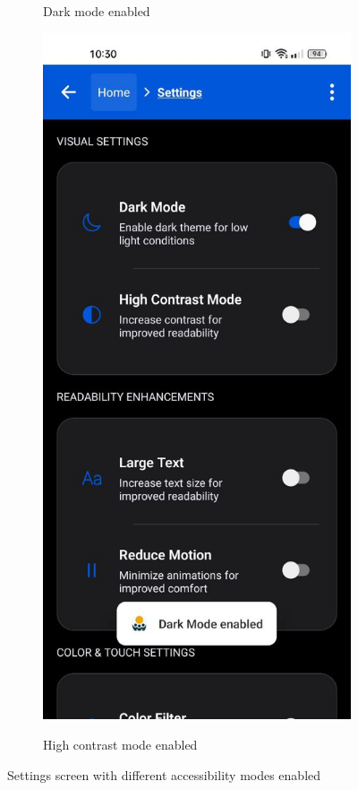 \begin{figure}[ht]
\begin{subfigure}[b]{0.48\textwidth}
        \caption{Dark mode enabled}
        \label{fig:settings-dark}
    \end{subfigure}
    \hfill
    \begin{subfigure}[b]{0.48\textwidth}
        \centering
        \includegraphics[width=\linewidth, alt={Settings screen with high contrast mode enabled}]{img/settings4.jpg}
        \caption{High contrast mode enabled}
        \label{fig:settings-contrast}
    \end{subfigure}
    \caption{Settings screen with different accessibility modes enabled}
    \label{fig:settings_modes}
\end{figure}

